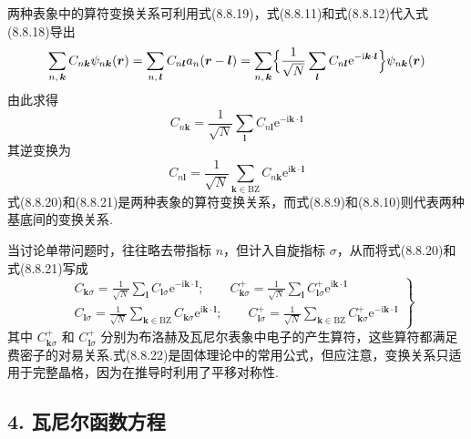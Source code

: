 两种表象中的算符变换关系可利用式(8.8.19)，式(8.8.11)和式(8.8.12)代入式(8.8.18)导出
\begin{equation*}
  \sum_{n,\,\boldsymbol{k}}C_{n\boldsymbol{k}}\psi_{n\boldsymbol{k}}(\boldsymbol{r})
  =\sum_{n,\,\boldsymbol{l}}C_{n\boldsymbol{l}}a_{n}(\boldsymbol{r}-\boldsymbol{l})
  =\sum_{n,\,\boldsymbol{k}}\Bigl\{\frac{1}{\sqrt{N}}\sum_{\boldsymbol{l}}C_{n\boldsymbol{l}}\mathrm{e}^{-\mathrm{i}\boldsymbol{k}\cdot\boldsymbol{l}}\Bigr\}\psi_{n\boldsymbol{k}}(\boldsymbol{r})
\end{equation*}
由此求得
\begin{equation}
  C_{n\boldsymbol{k}}=\frac{1}{\sqrt{N}}\sum_{\boldsymbol{l}}C_{n\boldsymbol{l}}\mathrm{e}^{-\mathrm{i}\boldsymbol{k}\cdot\boldsymbol{l}}
\end{equation}
其逆变换为
\begin{equation}
  C_{n\boldsymbol{l}}=\frac{1}{\sqrt{N}}\sum_{\boldsymbol{k}\in\mathrm{BZ}}C_{n\boldsymbol{k}}\mathrm{e}^{\mathrm{i}\boldsymbol{k}\cdot\boldsymbol{l}}
\end{equation}
式(8.8.20)和(8.8.21)是两种表象的算符变换关系，而式(8.8.9)和(8.8.10)则代表两种基底间的变换关系.

当讨论单带问题时，往往略去带指标 $n$，但计入自旋指标 $\sigma$，从而将式(8.8.20)和式(8.8.21)写成
\begin{equation}
  \left.
  \begin{aligned}
    &C_{\boldsymbol{k}\sigma}=\frac{1}{\sqrt{N}}\sum_{\boldsymbol{l}}C_{\boldsymbol{l}\sigma}\mathrm{e}^{-\mathrm{i}\boldsymbol{k}\cdot\boldsymbol{l}};
    \qquad
    C_{\boldsymbol{k}\sigma}^{+}=\frac{1}{\sqrt{N}}\sum_{\boldsymbol{l}}C_{\boldsymbol{l}\sigma}^{+}\mathrm{e}^{\mathrm{i}\boldsymbol{k}\cdot\boldsymbol{l}}\\
    &C_{\boldsymbol{l}\sigma}=\frac{1}{\sqrt{N}}\sum_{\boldsymbol{k}\in\mathrm{BZ}}C_{\boldsymbol{k}\sigma}\mathrm{e}^{\mathrm{i}\boldsymbol{k}\cdot\boldsymbol{l}};
    \qquad
    C_{\boldsymbol{l}\sigma}^{+}=\frac{1}{\sqrt{N}}\sum_{\boldsymbol{k}\in\mathrm{BZ}}C_{\boldsymbol{k}\sigma}^{+}\mathrm{e}^{-\mathrm{i}\boldsymbol{k}\cdot\boldsymbol{l}}
  \end{aligned}\right\}
\end{equation}
其中 $C_{\boldsymbol{k}\sigma}^{+}$ 和 $C_{\boldsymbol{l}\sigma}^{+}$ 分别为布洛赫及瓦尼尔表象中电子的产生算符，这些算符都满足费密子的对易关系.式(8.8.22)是固体理论中的常用公式，但应注意，变换关系只适用于完整晶格，因为在推导时利用了平移对称性.

\subsection*{4. 瓦尼尔函数方程}

